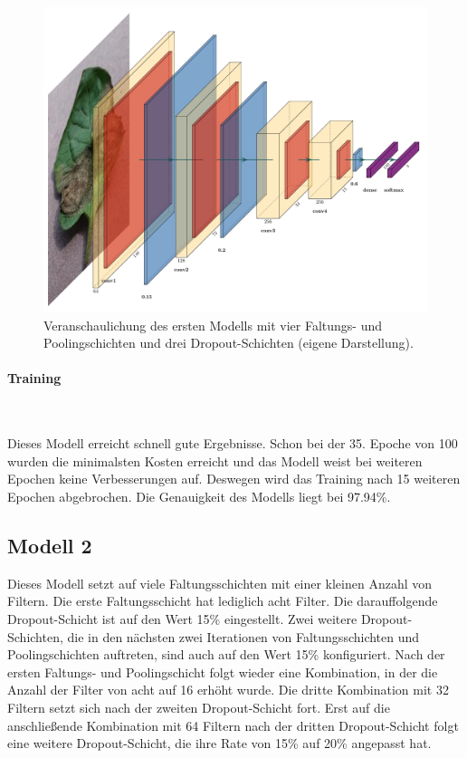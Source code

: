 \begin{figure}[h!]
	\centering
	\includegraphics[width=\textwidth]{bilder/voter1.pdf}
	\caption{Veranschaulichung des ersten Modells mit vier Faltungs- und Poolingschichten und drei Dropout-Schichten (eigene Darstellung).}
	\label{voter1}
\end{figure}

\newpage
\paragraph{Training}
~\newline

Dieses Modell erreicht schnell gute Ergebnisse. Schon bei der 35. Epoche von 100 wurden die minimalsten Kosten erreicht und das Modell weist bei weiteren Epochen keine Verbesserungen auf. Deswegen wird das Training nach 15 weiteren Epochen abgebrochen. Die Genauigkeit des Modells liegt bei 97.94\%. 


\subsection{Modell 2}
\label{model2_voter}

Dieses Modell setzt auf viele Faltungsschichten mit einer kleinen Anzahl von Filtern. Die erste Faltungsschicht hat lediglich acht Filter. Die darauffolgende Dropout-Schicht ist auf den Wert 15\% eingestellt. Zwei weitere Dropout-Schichten, die in den nächsten zwei Iterationen von Faltungsschichten und Poolingschichten auftreten, sind auch auf den Wert 15\% konfiguriert. Nach der ersten Faltungs- und Poolingschicht folgt wieder eine Kombination, in der die Anzahl der Filter von acht auf 16 erhöht wurde. Die dritte Kombination mit 32 Filtern setzt sich nach der zweiten Dropout-Schicht fort. Erst auf die anschließende Kombination mit 64 Filtern nach der dritten Dropout-Schicht folgt eine weitere Dropout-Schicht, die ihre Rate von 15\% auf 20\% angepasst hat.

